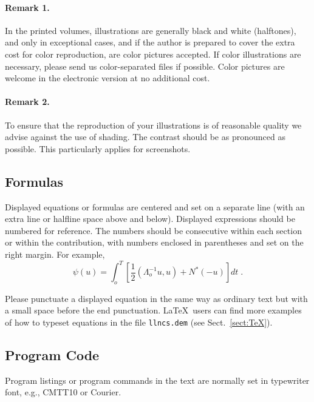 \documentclass[runningheads]{llncs}
\begin{document}
\paragraph{Remark 1.}

In the printed volumes, illustrations are generally black and white
(halftones), and only in exceptional cases, and if the author is
prepared
to cover the extra cost for color reproduction, are color pictures
accepted. If color illustrations are necessary, please send us
color-separated files if possible.
Color pictures are welcome in the electronic version at no additional
cost.

\paragraph{Remark 2.}

To ensure that the reproduction of your illustrations is of reasonable
quality we advise against the use of shading. The contrast should be as
pronounced as possible. This particularly applies for screenshots.


\subsection{Formulas}

Displayed equations or formulas are centered and set on a separate
line (with an extra line or halfline space above and below). Displayed
expressions should be numbered for reference. The numbers should be
consecutive within each section or within the contribution,
with numbers enclosed in parentheses and set on the right margin.
For example,
\begin{equation}
  \psi (u) = \int_{o}^{T} \left[\frac{1}{2}
  \left(\Lambda_{o}^{-1} u,u\right) + N^{\ast} (-u)\right] dt \;  .
\end{equation}

Please punctuate a displayed equation in the same way as ordinary
text but with a small space before the end punctuation.
\LaTeX\ users can find more examples of how to typeset equations in the
file \verb+llncs.dem+ (see Sect.~\ref{sect:TeX}).


\subsection{Program Code}

Program listings or program commands in the text are normally set in
typewriter font, e.g., CMTT10 or Courier.
\end{document}
